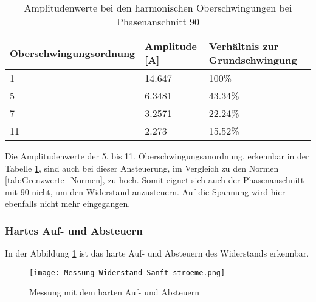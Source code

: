 \begin{table}[ht!]
	\centering
	\begin{tabular}{|l|l|l|}
		\hline
		Oberschwingungsordnung 	& Amplitude [A] & Verhältnis zur Grundschwingung	\\ \hline
		1       				& 14.647   		& 100\%								\\ \hline
		5      					& 6.3481    	& 43.34\%							\\ \hline
		7      					& 3.2571    	& 22.24\%							\\ \hline
		11      				& 2.273    		& 15.52\%							\\ \hline
	\end{tabular}
	\caption{Amplitudenwerte bei den harmonischen Oberschwingungen bei Phasenanschnitt 90\textdegree}\label{tab:Phas_90_Stroeme}
\end{table}

Die Amplitudenwerte der 5. bis 11. Oberschwingungsanordnung, erkennbar in der Tabelle \ref{tab:Phas_90_Stroeme}, sind auch bei dieser Ansteuerung, im Vergleich zu den Normen \ref{tab:Grenzwerte_Normen}, zu hoch. Somit eignet sich auch der Phasenanschnitt mit 90\textdegree \hspace{0.02cm} nicht, um den Widerstand anzusteuern. Auf die Spannung wird hier ebenfalls nicht mehr eingegangen. 


\newpage
\subsubsection*{Hartes Auf- und Absteuern}

In der Abbildung \ref{fig:Mess_Widerstand_Sanft_stroeme} ist das harte Auf- und Absteuern des Widerstands erkennbar. 

\begin{figure}[ht!]
	\centering
	\texttt{[image: Messung\_Widerstand\_Sanft\_stroeme.png]}	
	\caption{Messung mit dem harten Auf- und Absteuern}\label{fig:Mess_Widerstand_Sanft_stroeme}
\end{figure}


